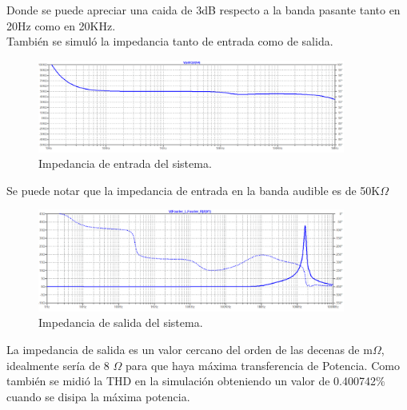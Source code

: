 Donde se puede apreciar una caida de 3dB respecto a la banda pasante tanto en 20Hz como en 20KHz.\\
También se simuló la impedancia tanto de entrada como de salida.
\begin{figure}[H]
	\centering
	\includegraphics[width=0.9\textwidth]{ImagenesSimulaciones/Zin.png}
	\caption{Impedancia de entrada del sistema.}
	\label{fig:zin}
\end{figure}
Se puede notar que la impedancia de entrada en la banda audible es de 50K$\Omega$
\begin{figure}[H]
	\centering
	\includegraphics[width=0.9\textwidth]{ImagenesSimulaciones/Zout.png}
	\caption{Impedancia de salida del sistema.}
	\label{fig:zout}
\end{figure}
La impedancia de salida es un valor cercano del orden de las decenas de  m$\Omega$, idealmente sería de 8 $\Omega$ para que haya máxima transferencia de Potencia.
Como también se midió la THD en la simulación obteniendo un valor de 0.400742$\%$ cuando se disipa la máxima potencia.

